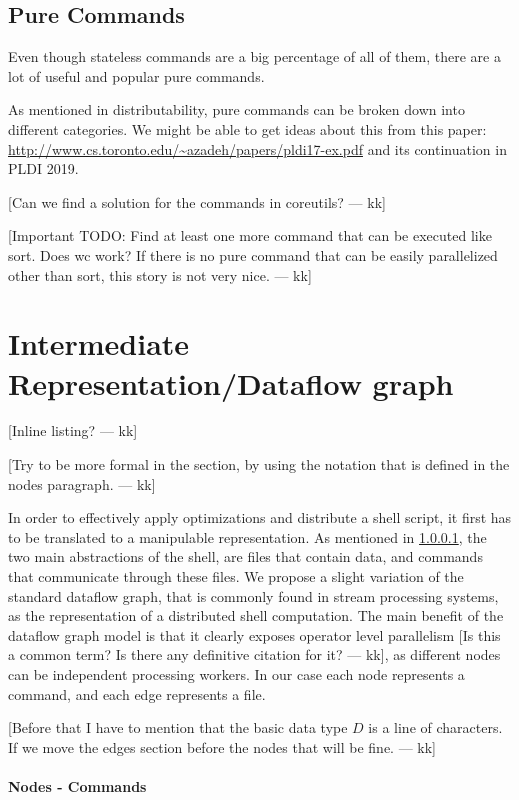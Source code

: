 \documentclass[sigplan,10pt,review,anonymous]{acmart}
\newcommand{\kk}[1]{[{\color{magenta}#1 --- kk}]}
\begin{document}
\subsection{Pure Commands}

Even though stateless commands are a big percentage of all of them,
there are a lot of useful and popular pure commands.

As mentioned in distributability, pure commands can be broken down
into different categories. We might be able to get ideas about this
from this paper:
\url{http://www.cs.toronto.edu/~azadeh/papers/pldi17-ex.pdf} and its
continuation in PLDI 2019.

\kk{Can we find a solution for the commands in coreutils?}

\kk{Important TODO: Find at least one more command that can be
  executed like sort. Does wc work? If there is no pure command that
  can be easily parallelized other than sort, this story is not very
  nice.}



\section{Intermediate Representation/Dataflow graph}
\label{ir}

\kk{Inline listing?}

\kk{Try to be more formal in the section, by using the notation that
  is defined in the nodes paragraph.}

In order to effectively apply optimizations and distribute a shell
script, it first has to be translated to a manipulable
representation. As mentioned in \ref{}, the two main abstractions of
the shell, are files that contain data, and commands that communicate
through these files. We propose a slight variation of the standard
dataflow graph, that is commonly found in stream processing systems,
as the representation of a distributed shell computation. The main
benefit of the dataflow graph model is that it clearly exposes
operator level parallelism \kk{Is this a common term? Is there any
  definitive citation for it?}, as different nodes can be independent
processing workers. In our case each node represents a command, and
each edge represents a file.


\kk{Before that I have to mention that the basic data type $D$ is a
  line of characters. If we move the edges section before the nodes
  that will be fine.}

\paragraph{Nodes - Commands}
\end{document}
